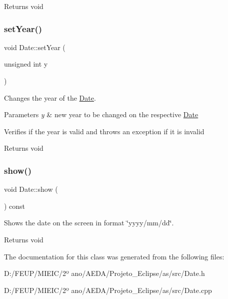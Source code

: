 \begin{DoxyReturn}{Returns}
void 
\end{DoxyReturn}
\mbox{\label{class_date_a12214ddd7d5aa3d614d8a068b9701bc4}} 
\subsubsection{\texorpdfstring{set\+Year()}{setYear()}}
{\footnotesize\ttfamily void Date\+::set\+Year (\begin{DoxyParamCaption}\item[{unsigned int}]{y }\end{DoxyParamCaption})}



Changes the year of the \hyperlink{class_date}{Date}. 


\begin{DoxyParams}{Parameters}
{\em y} & new year to be changed on the respective \hyperlink{class_date}{Date}\\
\hline
\end{DoxyParams}
Verifies if the year is valid and throws an exception if it is invalid

\begin{DoxyReturn}{Returns}
void 
\end{DoxyReturn}
\mbox{\label{class_date_a37f8fc7ca1692df7a8b265099c061721}} 
\subsubsection{\texorpdfstring{show()}{show()}}
{\footnotesize\ttfamily void Date\+::show (\begin{DoxyParamCaption}{ }\end{DoxyParamCaption}) const}



Shows the date on the screen in format \char`\"{}yyyy/mm/dd\char`\"{}. 

\begin{DoxyReturn}{Returns}
void 
\end{DoxyReturn}


The documentation for this class was generated from the following files\+:\begin{DoxyCompactItemize}
\item 
D\+:/\+F\+E\+U\+P/\+M\+I\+E\+I\+C/2º ano/\+A\+E\+D\+A/\+Projeto\+\_\+\+Eclipse/as/src/Date.\+h\item 
D\+:/\+F\+E\+U\+P/\+M\+I\+E\+I\+C/2º ano/\+A\+E\+D\+A/\+Projeto\+\_\+\+Eclipse/as/src/Date.\+cpp\end{DoxyCompactItemize}
